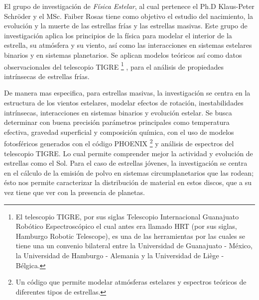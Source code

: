 \documentclass[11pt]{article}
\begin{document}
El grupo de investigación de \textit{Física Estelar}, al cual pertenece el Ph.D Klaus-Peter Schröder y el MSc. Faiber Rosas tiene como objetivo el estudio del nacimiento, la evolución y la muerte de las estrellas frías y las estrellas masivas.  Este grupo de investigación aplica los principios de la física para modelar el interior de la estrella, su atmósfera y su viento, así como las interacciones en sistemas estelares binarios y en sistemas planetarios. Se aplican modelos teóricos así como datos observacionales del telescopio TIGRE  \footnote{El telescopio TIGRE, por sus siglas Telescopio Internacional Guanajuato Robótico Espectroscópico el cual antes era llamado HRT (por sus siglas, Hamburgo Robotic Telescope), es una de las herramientas por las cuales se tiene una un convenio bilateral entre la Universidad de Guanajuato - México, la Universidad de Hamburgo - Alemania y la Universidad de Liège - Bélgica.} \cite{schmitt2014tigre}, para el análisis de propiedades intrínsecas de estrellas frías.

\noindent De manera mas especifica, para estrellas masivas, la investigación se centra en la estructura de los vientos estelares, modelar efectos de rotación,  inestabilidades intrínsecas, interacciones en sistemas binarios y  evolución estelar. Se busca determinar con buena precisión parámetros principales como temperatura efectiva, gravedad superficial y composición química, con el uso de modelos fotosféricos generados con el código PHOENIX \cite{hauschildt2005cool} \footnote{Un código que permite modelar atmósferas estelares y espectros teóricos de diferentes tipos de estrellas.} y análisis de espectros del telescopio TIGRE. Lo cual permite comprender mejor la actividad y evolución de estrellas como el Sol. Para el caso de estrellas jóvenes, la investigación se centra en el cálculo de la emisión de polvo en sistemas circumplanetarios que las rodean; ésto nos permite caracterizar la distribución de material en estos discos, que a su vez tiene que ver con la presencia de planetas. 
\end{document}
